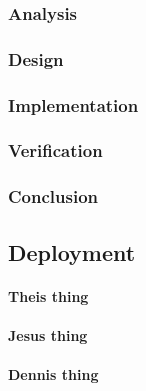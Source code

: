 \subsubsection{Analysis}
%
%
\subsubsection{Design}
%
%
\subsubsection{Implementation}
%
%
\subsubsection{Verification}
%
\subsubsection{Conclusion}
\subsection{Deployment}
\paragraph{Theis thing}
%
%
\paragraph{Jesus thing}
%
%
\paragraph{Dennis thing}
%
%